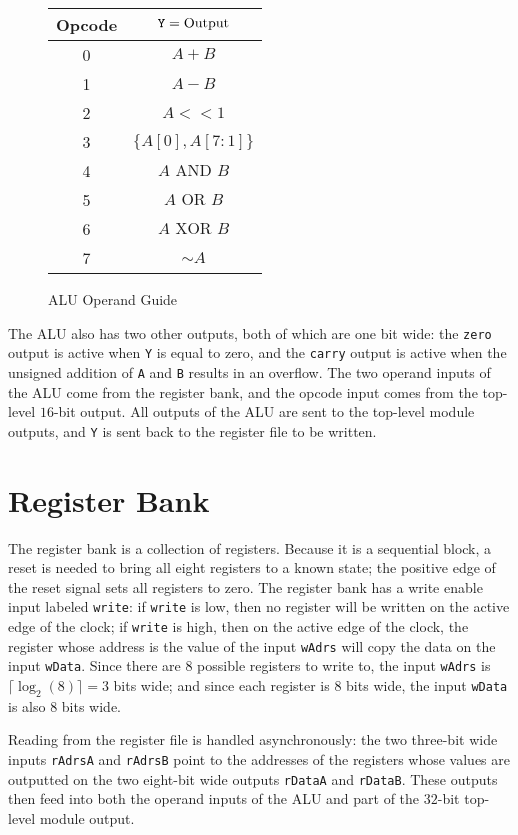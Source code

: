 \documentclass{article}
\begin{document}
\begin{figure}[h]
    \centering
    \begin{tabular}{| c | c |}
        \hline
        Opcode & \(\text{\texttt{Y}} = \text{Output}\)\\ \hline
        0 & \(A + B\) \\ \hline
        1 & \(A - B\) \\ \hline
        2 & \(A << 1\) \\ \hline
        3 & \(\{A[0], A[7:1]\}\) \\ \hline
        4 & \(A \text{ AND } B\) \\ \hline
        5 & \(A \text{ OR } B\) \\ \hline
        6 & \(A\text{ XOR } B\) \\ \hline
        7 & \(\sim A\) \\ \hline

    \end{tabular}
    \caption{ALU Operand Guide}
    \label{fig1}
\end{figure}

The ALU also has two other outputs, both of which are one bit
wide: the \texttt{zero} output is active when \texttt{Y} is
equal to zero, and the \texttt{carry} output is active when
the unsigned addition of \texttt{A} and \texttt{B} results
in an overflow. The two operand inputs of the ALU come from
the register bank, and the opcode input comes from the
top-level \(16\)-bit output.
All outputs of the ALU are sent to the top-level module outputs,
and \texttt{Y} is sent back to the register file to be written.

\section{Register Bank} The register bank is a collection of
registers. Because it is a sequential block, a reset is needed
to bring all eight registers to a known state; the positive edge
of the reset signal sets all registers to zero. The register bank
has a write enable input labeled \texttt{write}: if \texttt{write}
is low, then no register will be written on the active edge of
the clock; if \texttt{write} is high, then on the active edge
of the clock, the register whose address is the value of the
input \texttt{wAdrs} will copy the data on the input
\texttt{wData}. Since there are \(8\) possible registers
to write to, the input \texttt{wAdrs} is \(\lceil\log_2(8)\rceil = 3\)
bits wide; and since each register is \(8\) bits wide,
the input \texttt{wData} is also \(8\) bits wide.

Reading from the register file is handled asynchronously:
the two three-bit wide inputs \texttt{rAdrsA} and \texttt{rAdrsB}
point to the addresses of the registers whose values are outputted
on the two eight-bit wide outputs \texttt{rDataA} and \texttt{rDataB}.
These outputs then feed into both the operand inputs of the
ALU and part of the \(32\)-bit top-level module output.
\end{document}
